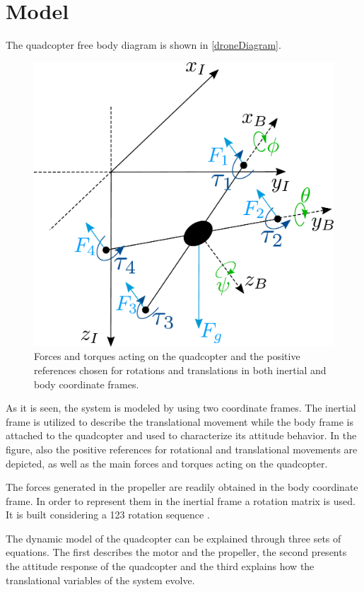 \section{Model}
The quadcopter free body diagram is shown in \autoref{droneDiagram}. 
\begin{figure}[H]
	\centering
	\includegraphics[scale=0.25]{figures/droneDiagram}
	\caption{Forces and torques acting on the quadcopter and the positive references chosen for rotations and translations in both inertial and body coordinate frames.}
	\label{droneDiagram}
\end{figure}
%
As it is seen, the system is modeled by using two coordinate frames. The inertial frame is utilized to describe the translational movement while the body frame is attached to the quadcopter and used to characterize its attitude behavior. In the figure, also the positive references for rotational and translational movements are depicted, as well as the main forces and torques acting on the quadcopter. 

The forces generated in the propeller are readily obtained in the body coordinate frame. In order to represent them in the inertial frame a rotation matrix is used. It is built considering a 123 rotation sequence \cite{rotationmatrix}.
 
The dynamic model of the quadcopter can be explained through three sets of equations. The first describes the motor and the propeller, the second presents the attitude response of the quadcopter and the third explains how the translational variables of the system evolve.

